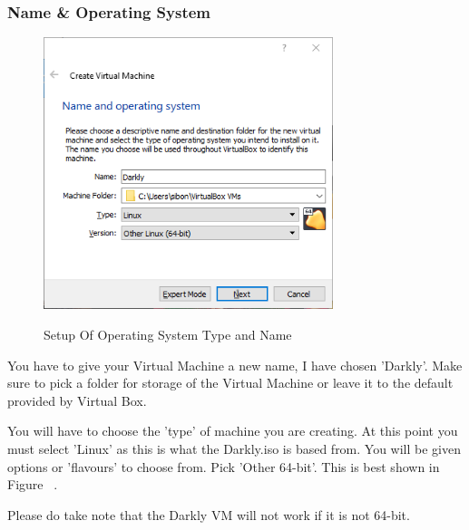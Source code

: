 \subsubsection{Name \& Operating System}
\begin{figure}[!htb]
    \centering
    \includegraphics[width=0.752\textwidth]{images/Win00-01.png}\\[0cm]  
    \caption[Windows Virtual Box]{Setup Of Operating System Type and Name}
    \label{fig:00-02 - Windows Virtual Box Operating System} 
\end{figure}
You have to give your Virtual Machine a new name, I have chosen 'Darkly'. Make
sure to pick a folder for storage of the Virtual Machine or leave it to the
default provided by Virtual Box.

You will have to choose the 'type' of machine you are creating. At this point
you must select 'Linux' as this is what the Darkly.iso is based from. You will
be given options or 'flavours' to choose from. Pick 'Other 64-bit'. This is
best shown in Figure ~.

Please do take note that the Darkly VM will not work if it is not 64-bit.

